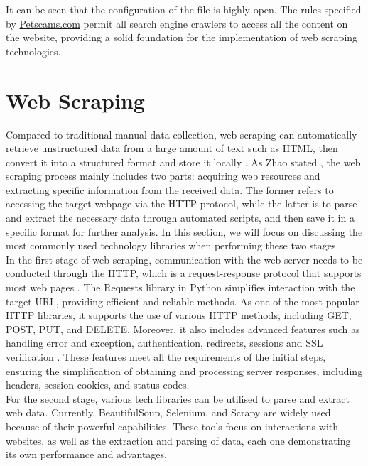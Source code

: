 \documentclass[ oneside,%
                    author={Cassie Qing Tang},
                    degree={BSc},
                     title={An Automated Response System for Disrupting Online Pet Scamming \\ },
                    subtitle={ }]{dissertation}
\begin{document}
It can be seen that the configuration of the file is highly open. The rules specified by \href{https://www.petscams.com}{Petscams.com} permit all search engine crawlers to access all the content on the website, providing a solid foundation for the implementation of web scraping technologies.
\\

\section{Web Scraping}
Compared to traditional manual data collection, web scraping can automatically retrieve unstructured data from a large amount of text such as HTML, then convert it into a structured format and store it locally \cite{khder_web_2021}. As Zhao stated \cite{zhao_web_2017}, the web scraping process mainly includes two parts: acquiring web resources and extracting specific information from the received data. The former refers to accessing the target webpage via the HTTP protocol, while the latter is to parse and extract the necessary data through automated scripts, and then save it in a specific format for further analysis. In this section, we will focus on discussing the most commonly used technology libraries when performing these two stages.
\\

In the first stage of web scraping, communication with the web server needs to be conducted through the HTTP, which is a request-response protocol that supports most web pages \cite{chandra_python_2015}. The Requests library in Python simplifies interaction with the target URL, providing efficient and reliable methods. As one of the most popular HTTP libraries, it supports the use of various HTTP methods, including GET, POST, PUT, and DELETE. Moreover, it also includes advanced features such as handling error and exception, authentication, redirects, sessions and SSL verification \cite{noauthor_requests_nodate}. These features meet all the requirements of the initial steps, ensuring the simplification of obtaining and processing server responses, including headers, session cookies, and status codes.
\\

For the second stage, various tech libraries can be utilised to parse and extract web data. Currently, BeautifulSoup, Selenium, and Scrapy are widely used because of their powerful capabilities. These tools focus on interactions with websites, as well as the extraction and parsing of data, each one demonstrating its own performance and advantages.
\\
\end{document}
